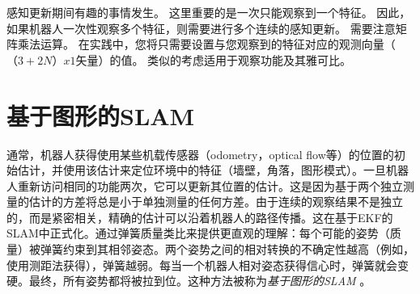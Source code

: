 感知更新期间有趣的事情发生。 这里重要的是一次只能观察到一个特征。 因此，如果机器人一次性观察多个特征，则需要进行多个连续的感知更新。 需要注意矩阵乘法运算。 在实践中，您将只需要设置与您观察到的特征对应的观测向量（$（3 + 2N）x1 $矢量）的值。 类似的考虑适用于观察功能及其雅可比。

\section{基于图形的SLAM}


通常，机器人获得使用某些机载传感器（odometry，optical flow等）的位置的初始估计，并使用该估计来定位环境中的特征（墙壁，角落，图形模式）。一旦机器人重新访问相同的功能两次，它可以更新其位置的估计。这是因为基于两个独立测量的估计的方差将总是小于单独测量的任何方差。由于连续的观察结果不是独立的，而是紧密相关，精确的估计可以沿着机器人的路径传播。这在基于EKF的SLAM中正式化。通过弹簧质量类比来提供更直观的理解：每个可能的姿势（质量）被弹簧约束到其相邻姿态。两个姿势之间的相对转换的不确定性越高（例如，使用测距法获得），弹簧越弱。每当一个机器人相对姿态获得信心时，弹簧就会变硬。最终，所有姿势都将被拉到位。这种方法被称为\emph {基于图形的SLAM} 。

